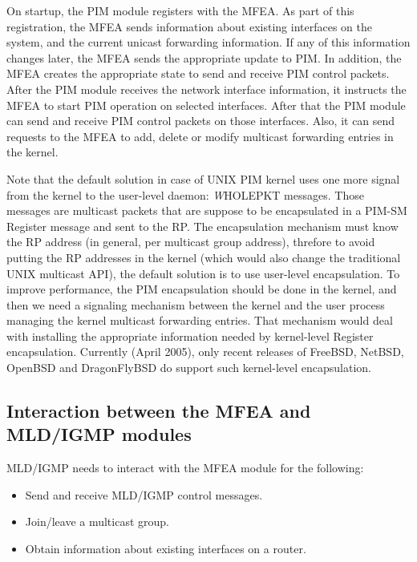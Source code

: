 \documentclass[11pt]{article}
\begin{document}
On startup, the PIM module registers with the MFEA. As part of this
registration, the MFEA sends information about existing
interfaces on the system, and the current unicast forwarding
information. If any of this information changes later, the MFEA sends
the appropriate update to PIM. In addition, the MFEA creates the
appropriate state to send and receive PIM control packets. After the
PIM module receives the network interface information, it instructs the
MFEA to start PIM operation on selected interfaces. After that the PIM
module can send and receive PIM control packets on those interfaces.
Also, it can send requests to the MFEA to add, delete or modify multicast
forwarding entries in the kernel.

Note that the default solution in case of UNIX PIM kernel
uses one more signal from the kernel to the user-level daemon:
{\emph WHOLEPKT} messages. Those messages are multicast packets that are
suppose to be encapsulated in a PIM-SM Register message and sent to the
RP. The encapsulation mechanism must know the RP address (in general,
per multicast group address), threfore to avoid putting the RP addresses in
the kernel (which would also change the traditional UNIX multicast API), the
default solution is to use user-level encapsulation.  To improve
performance, the PIM encapsulation should be done in the kernel, and
then we need a signaling mechanism between the kernel and the user
process managing the kernel multicast forwarding entries. That mechanism
would deal with installing the appropriate information needed by kernel-level
Register encapsulation. Currently (April 2005), only recent releases
of FreeBSD, NetBSD, OpenBSD and DragonFlyBSD do support such
kernel-level encapsulation.

\subsection{Interaction between the MFEA and MLD/IGMP modules}

MLD/IGMP needs to interact with the MFEA module for the following:

\begin{itemize}

  \item Send and receive MLD/IGMP control messages.

  \item Join/leave a multicast group.

  \item Obtain information about existing interfaces on a router.

\end{itemize}
\end{document}

